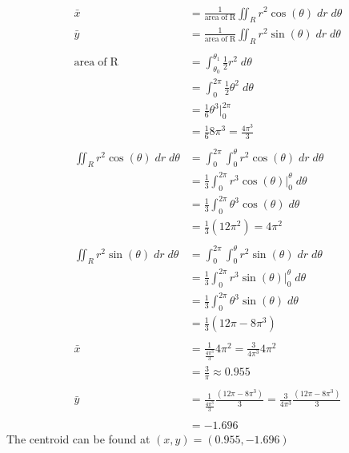 \documentclass[a4paper,11pt]{article}
\begin{document}
\begin{preview}
\begin{enumerate}
\begin{enumerate}
    \begin{align*}
        \bar{x} &= \frac{1}{\mathrm{area \; of \; R}} \iint_{R}r^2\cos(\theta) \; dr\; d\theta\\
        \bar{y} &= \frac{1}{\mathrm{area \; of \; R}} \iint_{R}r^2\sin(\theta) \; dr\; d\theta\\\\
        \mathrm{area \; of \; R} &= \int_{\theta_0}^{\theta_1}\frac{1}{2}r^2 \; d \theta\\
        &= \int_{0}^{2\pi}\frac{1}{2} \theta^2 \; d \theta\\
        &= \frac{1}{6} \theta^3 \Big|_{0}^{2\pi}\\
        &= \frac{1}{6} 8\pi^3 = \frac{4\pi^3}{3}\\\\
        \iint_{R}r^2\cos(\theta) \; dr\; d\theta &= \int_{0}^{2\pi}\int_{0}^{\theta} r^2\cos(\theta) \; dr\; d\theta\\
        &= \frac{1}{3} \int_{0}^{2\pi} r^3\cos(\theta)\Big|_{0}^{\theta} \; d\theta \\
        &= \frac{1}{3} \int_{0}^{2\pi} \theta^3\cos(\theta) \; d\theta \\
        &= \frac{1}{3}(12\pi^2) = 4\pi^2\\\\
        \iint_{R}r^2\sin(\theta) \; dr\; d\theta &= \int_{0}^{2\pi}\int_{0}^{\theta} r^2\sin(\theta) \; dr\; d\theta\\
        &= \frac{1}{3} \int_{0}^{2\pi} r^3\sin(\theta)\Big|_{0}^{\theta} \; d\theta \\
        &= \frac{1}{3} \int_{0}^{2\pi} \theta^3\sin(\theta) \; d\theta \\
        &= \frac{1}{3}(12\pi - 8\pi^3)\\\\
        \bar{x} &= \frac{1}{\frac{4\pi^3}{3}}4\pi^2 = \frac{3}{4\pi^3}4\pi^2 \\
        &= \frac{3}{\pi} \approx 0.955\\\\
        \bar{y} &= \frac{1}{\frac{4\pi^3}{3}}\frac{(12\pi - 8\pi^3)}{3} = \frac{3}{4\pi^3}\frac{(12\pi - 8\pi^3)}{3}\\\\
        &= -1.696
    \end{align*}
    The centroid can be found at $(x,y)=(0.955, -1.696)$\\

\end{enumerate}


\end{enumerate}
\end{preview}
\end{document}
